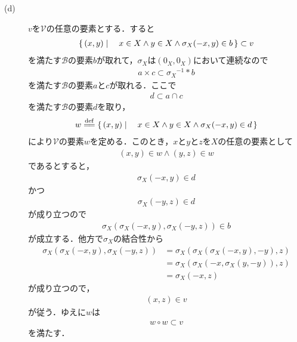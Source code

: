 \begin{sketch}
\begin{description}
		\item[(d)] $v$を$\mathscr{V}$の任意の要素とする．すると
			\begin{align}
				\left\{\, (x,y) \mid \quad x \in X \wedge y \in X \wedge \sigma_X(-x,y) \in b\, \right\} \subset v
			\end{align}
			を満たす$\mathscr{B}$の要素$b$が取れて，$\sigma_X$は$(0_X,0_X)$において連続なので
			\begin{align}
				a \times c \subset {\sigma_X}^{-1} \ast b
			\end{align}
			を満たす$\mathscr{B}$の要素$a$と$c$が取れる．ここで
			\begin{align}
				d \subset a \cap c
			\end{align}
			を満たす$\mathscr{B}$の要素$d$を取り，
			\begin{align}
				w \defeq \Set{(x,y)}{x \in X \wedge y \in X \wedge \sigma_X(-x,y) \in d}
			\end{align}
			により$\mathscr{V}$の要素$w$を定める．このとき，$x$と$y$と$z$を$X$の任意の要素として
			\begin{align}
				(x,y) \in w \wedge (y,z) \in w
			\end{align}
			であるとすると，
			\begin{align}
				\sigma_X(-x,y) \in d
			\end{align}
			かつ
			\begin{align}
				\sigma_X(-y,z) \in d
			\end{align}
			が成り立つので
			\begin{align}
				\sigma_X\left(\sigma_X(-x,y),\sigma_X(-y,z)\right) \in b
			\end{align}
			が成立する．他方で$\sigma_X$の結合性から
			\begin{align}
				\sigma_X\left(\sigma_X(-x,y),\sigma_X(-y,z)\right)
				&= \sigma_X\left(\sigma_X\left(\sigma_X(-x,y),-y\right),z\right) \\
				&= \sigma_X\left(\sigma_X\left(-x,\sigma_X(y,-y)\right),z\right) \\
				&= \sigma_X(-x,z)
			\end{align}
			が成り立つので，
			\begin{align}
				(x,z) \in v
			\end{align}
			が従う．ゆえに$w$は
			\begin{align}
				w \circ w \subset v
			\end{align}
			を満たす．
			

\end{description}
\end{sketch}
